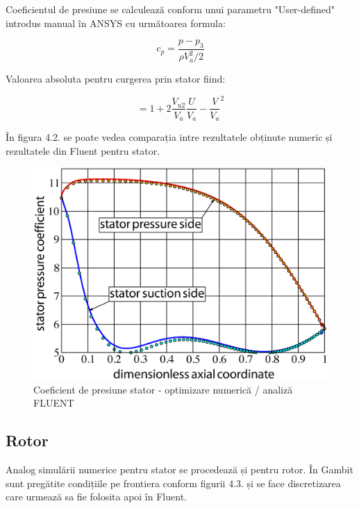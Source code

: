 Coeficientul de presiune se calculează conform unui parametru "User-defined" introdus manual în ANSYS cu următoarea formula:

\begin{equation}
c_p = \frac{p-p_3}{\rho V_a^2 / 2}
\end{equation}

Valoarea absoluta pentru curgerea prin stator fiind:

\begin{equation}
= 1 + 2 \frac{V_{u2}}{V_a} \frac{U}{V_a} - {\frac{V}{V_a}}^2
\end{equation}

În figura 4.2. se poate vedea comparația intre rezultatele obținute numeric și rezultatele din Fluent pentru stator.

\begin{figure}[h]
	\centering
	\includegraphics[scale=0.4]{figures/cp-stator-ezdraw.eps}
	\caption{Coeficient de presiune stator - optimizare numerică / analiză FLUENT}
	\label{Coeficient de presiune stator - optimizare numerică / analiză FLUENT}
\end{figure}

\clearpage

\subsection{Rotor}

Analog simulării numerice pentru stator se procedează și pentru rotor. În Gambit sunt pregătite condițiile pe frontiera conform figurii 4.3. și se face discretizarea care urmează sa fie folosita apoi în Fluent.

